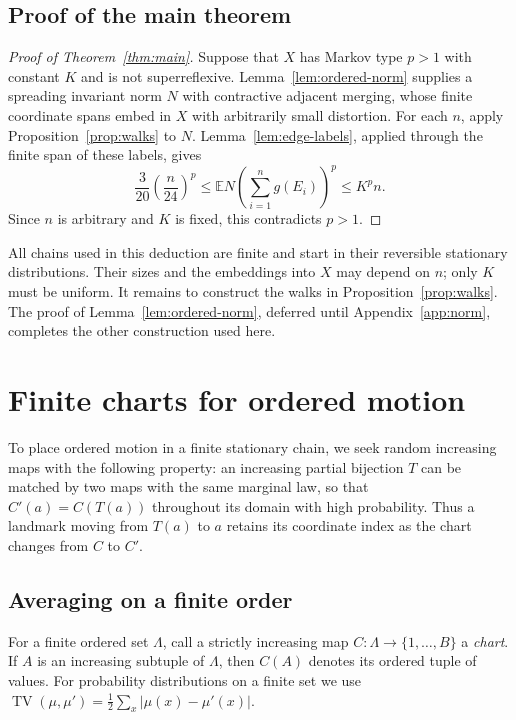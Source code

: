 \documentclass[11pt]{article}
\theoremstyle{definition}
\theoremstyle{remark}
\newcommand{\E}{\mathbb E}
\newcommand{\TV}{\operatorname{TV}}
\begin{document}
\subsection{Proof of the main theorem}

\begin{proof}[Proof of Theorem~\ref{thm:main}]
Suppose that $X$ has Markov type $p>1$ with constant $K$ and is not
superreflexive. Lemma~\ref{lem:ordered-norm} supplies a spreading
invariant norm $N$ with contractive adjacent merging, whose finite
coordinate spans embed in $X$ with arbitrarily small distortion.
For each $n$, apply Proposition~\ref{prop:walks} to $N$.
Lemma~\ref{lem:edge-labels}, applied through the finite span of these
labels, gives
\begin{equation}\label{eq:contradiction}
 \frac3{20}\left(\frac n{24}\right)^p
 \leq\E N\left(\sum_{i=1}^n g(E_i)\right)^p
 \leq K^p n.
\end{equation}
Since $n$ is arbitrary and $K$ is fixed, this contradicts $p>1$.
\end{proof}

All chains used in this deduction are finite and start in their
reversible stationary distributions. Their sizes and the embeddings
into $X$ may depend on $n$; only $K$ must be uniform.
It remains to construct the walks in Proposition~\ref{prop:walks}.
The proof of Lemma~\ref{lem:ordered-norm}, deferred until
Appendix~\ref{app:norm}, completes the other construction used here.

\section{Finite charts for ordered motion}\label{sec:finite-lemmas}

To place ordered motion in a finite stationary chain, we seek random
increasing maps with the following property: an increasing partial
bijection $T$ can be matched by two maps with the same marginal law,
so that $C'(a)=C(T(a))$ throughout its domain with high probability.
Thus a landmark moving from $T(a)$ to $a$ retains its coordinate index
as the chart changes from $C$ to $C'$.

\subsection{Averaging on a finite order}

For a finite ordered set $\Lambda$, call a strictly increasing map
$C:\Lambda\to\{1,\ldots,B\}$ a \emph{chart}. If $A$ is an increasing
subtuple of $\Lambda$, then $C(A)$ denotes its ordered tuple of values.
For probability distributions on a finite set we use
$\TV(\mu,\mu')=\frac12\sum_x|\mu(x)-\mu'(x)|$.
\end{document}
